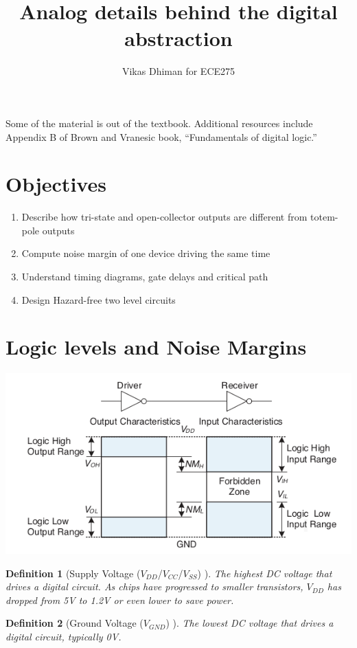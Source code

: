 \documentclass{article}
\author{Vikas Dhiman for ECE275}
\title{Analog details behind the digital abstraction}
\newtheorem{definition}{Definition}
\newcommand{\notescol}{white}
\begin{document}
\maketitle

Some of the material is out of the textbook. Additional resources include
Appendix B of Brown and Vranesic book, ``Fundamentals of digital logic.''

\section{Objectives}
\begin{enumerate}
\item Describe how tri-state and open-collector outputs are different from totem-pole outputs
\item Compute noise margin of one device driving the same time
\item Understand timing diagrams, gate delays and critical path
\item Design Hazard-free two level circuits
\end{enumerate}

\section{Logic levels and Noise Margins}

\includegraphics[width=0.8\linewidth]{fig/logic-levels-and-noise-margins.png}

\begin{definition}[Supply Voltage ($V_{DD}$/$V_{CC}$/$V_{SS}$) ]
  \color{\notescol}
  The highest DC voltage that drives a digital circuit. As chips have progressed
  to smaller transistors, $V_{DD}$ has dropped from 5V to 1.2V or even lower to
  save power.
\end{definition}

\begin{definition}[Ground Voltage ($V_{GND}$) ]
  \color{\notescol}
  The lowest DC voltage that drives a digital circuit, typically 0V.
\end{definition}
\end{document}
